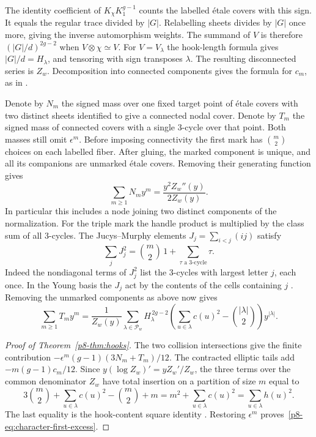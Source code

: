 The identity coefficient of $K_\chi K_1^{g-1}$ counts the labelled
\'etale covers with this sign. It equals the regular trace divided
by $|G|$. Relabelling sheets divides by $|G|$ once more, giving
the inverse automorphism weights. The summand of $V$ is therefore
$(|G|/d)^{2g-2}$ when $V\otimes\chi\simeq V$. For
$V=V_\lambda$ the hook-length formula gives $|G|/d=H_\lambda$,
and tensoring with sign transposes $\lambda$. The resulting
disconnected series is $Z_w$. Decomposition into connected
components gives the formula for $c_m$, as in \cite[Appendix~F]{WueUnramified}.

Denote by $N_m$ the signed mass over one fixed target point of
\'etale covers with two distinct sheets identified to give a
connected nodal cover. Denote by $T_m$ the signed mass of connected
covers with a single 3-cycle over that point. Both masses still omit
$\epsilon^m$. Before imposing connectivity the first mark has
$\binom m2$ choices on each labelled fiber. After gluing, the marked
component is unique, and all its companions are unmarked \'etale
covers. Removing their generating function gives
\begin{equation}
    \sum_{m\ge1}N_m y^m=\frac{y^2 Z_w''(y)}{2Z_w(y)}.
 \label{p8-eq:character-nodal}
\end{equation}
In particular this includes a node joining two distinct components
of the normalization. For the triple mark the handle product is
multiplied by the class sum of all 3-cycles. The Jucys--Murphy
elements $J_j=\sum_{i<j}(ij)$ satisfy
\[
     \sum_j J_j^2=\binom m2\,1+\sum_{\tau\text{ a 3-cycle}}\tau .
\]
Indeed the nondiagonal terms of $J_j^2$ list the 3-cycles with
largest letter $j$, each once. In the Young basis the $J_j$ act
by the contents of the cells containing $j$ \cite{jucys}. Removing
the unmarked components as above now gives
\begin{equation}
 \sum_{m\ge1}T_m y^m
  =\frac{1}{Z_w(y)}\sum_{\lambda\in\mathcal P_w}
      H_\lambda^{\,2g-2}
      \left(\sum_{u\in\lambda}c(u)^2-\binom{|\lambda|}{2}\right)
      y^{|\lambda|}.
 \label{p8-eq:character-triple}
\end{equation}

\begin{proof}[Proof of Theorem~\ref{p8-thm:hooks}]
The two collision intersections give the finite contribution
$-\epsilon^m(g-1)(3N_m+T_m)/12$. The contracted elliptic tails add
$-m(g-1)c_m/12$. Since $y(\log Z_w)'=y Z_w'/Z_w$, the three
terms over the common denominator $Z_w$ have total insertion on
a partition of size $m$ equal to
\[
 3\binom m2+\sum_{u\in\lambda}c(u)^2-\binom m2+m
 =m^2+\sum_{u\in\lambda}c(u)^2
 =\sum_{u\in\lambda}h(u)^2 .
\]
The last equality is the hook-content square identity \cite{menon}.
Restoring $\epsilon^m$ proves~\eqref{p8-eq:character-first-excess}.
\end{proof}


